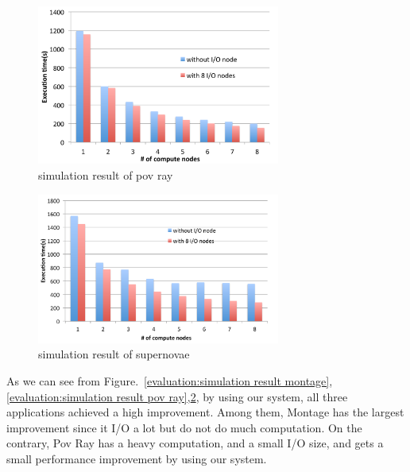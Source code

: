 \begin{figure}
\centering
\includegraphics[width=8cm]{img/simulation_povray}
\caption{simulation result of pov ray}
\label{evaluation:simulation result pov ray}
\end{figure}

\begin{figure}
\centering
\includegraphics[width=8cm]{img/simulation_supernovae}
\caption{simulation result of supernovae}
\label{evaluation:simulation result supernovae}
\end{figure}

As we can see from Figure.~\ref{evaluation:simulation result montage},\ref{evaluation:simulation
result pov ray},\ref{evaluation:simulation result supernovae}, by using our system, all three
applications achieved a high improvement.
Among them, Montage has the largest improvement since it I/O a lot but do not do much
computation.
On the contrary, Pov Ray has a heavy computation, and a small I/O size, and gets a small performance
improvement by using our system.
